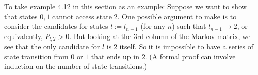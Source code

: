 \documentclass[a4paper]{article}
\begin{document}
To take example 4.12 in this section as an example: Suppose we want to show that states $0,1$ cannot access state $2$. One possible argument to make is to consider the candidates for states $l:=l_{n-1}$ (for any $n$) such that $l_{n-1}\rightarrow 2$, or equivalently, $P_{l,2} > 0$. But looking at the 3rd column of the Markov matrix, we see that the only candidate for $l$ is $2$ itself. So it is impossible to have a series of state transition from $0$ or $1$ that ends up in $2$. (A formal proof can involve induction on the number of state transitions.)
\end{document}
